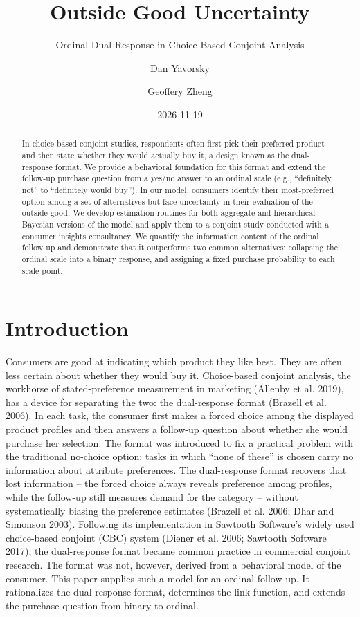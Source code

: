\documentclass[
  letterpaper,
  DIV=11,
  numbers=noendperiod]{scrartcl}
\title{Outside Good Uncertainty}
\subtitle{Ordinal Dual Response in Choice-Based Conjoint Analysis}
\author{Dan Yavorsky \and Geoffery Zheng}
\date{2026-11-19}
\newcounter{none} %
\theoremstyle{plain}
\theoremstyle{plain}
\theoremstyle{plain}
\theoremstyle{remark}
\begin{document}
\maketitle
\begin{abstract}
In choice-based conjoint studies, respondents often first pick their
preferred product and then state whether they would actually buy it, a
design known as the dual-response format. We provide a behavioral
foundation for this format and extend the follow-up purchase question
from a yes/no answer to an ordinal scale (e.g., ``definitely not'' to
``definitely would buy''). In our model, consumers identify their
most-preferred option among a set of alternatives but face uncertainty
in their evaluation of the outside good. We develop estimation routines
for both aggregate and hierarchical Bayesian versions of the model and
apply them to a conjoint study conducted with a consumer insights
consultancy. We quantify the information content of the ordinal follow
up and demonstrate that it outperforms two common alternatives:
collapsing the ordinal scale into a binary response, and assigning a
fixed purchase probability to each scale point.
\end{abstract}


  \newcommand{\x}{\mathbf{x}}
  \newcommand{\bfbeta}{\boldsymbol{\beta}}
  \newcommand{\betabar}{\bar{\bfbeta}}
  \newcommand{\bftheta}{\boldsymbol{\theta}}
  \newcommand{\iid}{\stackrel{iid}{\sim}}
  \newcommand{\E}{\operatorname{E}}

\section{Introduction}\label{sec-intro}

Consumers are good at indicating which product they like best. They are
often less certain about whether they would buy it. Choice-based
conjoint analysis, the workhorse of stated-preference measurement in
marketing (Allenby et al. 2019), has a device for separating the two:
the dual-response format (Brazell et al. 2006). In each task, the
consumer first makes a forced choice among the displayed product
profiles and then answers a follow-up question about whether she would
purchase her selection. The format was introduced to fix a practical
problem with the traditional no-choice option: tasks in which ``none of
these'' is chosen carry no information about attribute preferences. The
dual-response format recovers that lost information -- the forced choice
always reveals preference among profiles, while the follow-up still
measures demand for the category -- without systematically biasing the
preference estimates (Brazell et al. 2006; Dhar and Simonson 2003).
Following its implementation in Sawtooth Software's widely used
choice-based conjoint (CBC) system (Diener et al. 2006; Sawtooth
Software 2017), the dual-response format became common practice in
commercial conjoint research. The format was not, however, derived from
a behavioral model of the consumer. This paper supplies such a model for
an ordinal follow-up. It rationalizes the dual-response format,
determines the link function, and extends the purchase question from
binary to ordinal.
\end{document}
